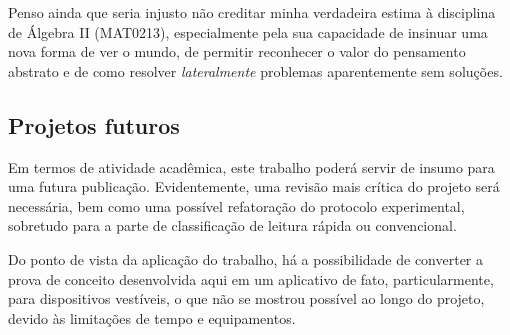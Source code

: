 \documentclass[12pt]{article}
\begin{document}
		Penso ainda que seria injusto não creditar minha verdadeira estima à disciplina de Álgebra II (MAT0213), especialmente pela sua capacidade de insinuar uma nova forma de ver o mundo, de permitir reconhecer o valor do pensamento abstrato e de como resolver \textit{lateralmente} problemas aparentemente sem soluções.
		
		\subsection{Projetos futuros}
		
		Em termos de atividade acadêmica, este trabalho poderá servir de insumo para uma futura publicação. Evidentemente, uma revisão mais crítica do projeto será necessária, bem como uma possível refatoração do protocolo experimental, sobretudo para a parte de classificação de leitura rápida ou convencional.
		
		Do ponto de vista da aplicação do trabalho, há a possibilidade de converter a prova de conceito desenvolvida aqui em um aplicativo de fato, particularmente, para dispositivos vestíveis, o que não se mostrou possível ao longo do projeto, devido às limitações de tempo e equipamentos.
		

		\clearpage
		
		
		\makeatletter
		\renewenvironment{thebibliography}[1]
		{\section{\bibname}%
			\@mkboth{\MakeUppercase\bibname}{\MakeUppercase\bibname}%
			\list{\@biblabel{\@arabic\c@enumiv}}%
			{\settowidth\labelwidth{\@biblabel{#1}}%
				\leftmargin\labelwidth
				\advance\leftmargin\labelsep
				\@openbib@code
				\usecounter{enumiv}%
				\let\p@enumiv\@empty
				\renewcommand\theenumiv{\@arabic\c@enumiv}}%
			\sloppy
			\clubpenalty4000
			\@clubpenalty \clubpenalty
			\widowpenalty4000%
			\sfcode`\.\@m}
		{\def\@noitemerr
			{\@latex@warning{Empty `thebibliography' environment}}%
			\endlist}
		\makeatother
		
	
	 
\end{document}

